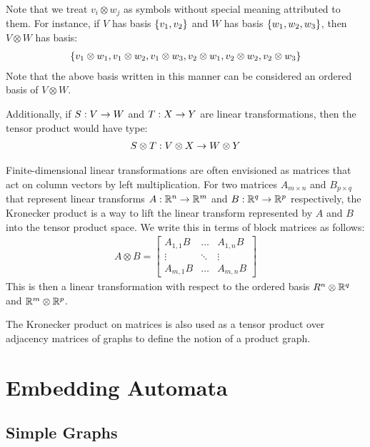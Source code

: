 \documentclass[12pt]{article}
\begin{document}
Note that we treat \(v_i \otimes w_j\)
as symbols without special meaning attributed to them.
For instance, if \(V\) has basis \(\left\{v_1, v_2\right\}\)
and \(W\) has basis \(\left\{w_1, w_2, w_3\right\}\),
then \(V \otimes W\) has basis:
\begin{align*}
  \left\{v_1 \otimes w_1, v_1 \otimes w_2, v_1 \otimes w_3,
          v_2 \otimes w_1, v_2 \otimes w_2, v_2 \otimes w_3\right\}
\end{align*}
Note that the above basis written in this manner can be considered
an ordered basis of \(V \otimes W\).

Additionally, if \(S : V \to W\) and \(T : X \to Y\)
are linear transformations,
then the tensor product would have type:
\begin{align*}
  S \otimes T : V \otimes X \to W \otimes Y
\end{align*}

Finite-dimensional linear transformations are often envisioned
as matrices that act on column vectors by left multiplication.
For two matrices \(A_{m \times n}\) and \(B_{p \times q}\)
that represent linear transforms
\(A : \mathbb{R}^n \to \mathbb{R}^m\) and \(B : \mathbb{R}^q \to \mathbb{R}^p\) respectively,
the Kronecker product is a way to lift the linear
transform represented by \(A\) and \(B\) into the tensor product space.
We write this in terms of block matrices as follows:
\begin{align*}
  {A \otimes B}
    = \begin{bmatrix}
        A_{1, 1} B & \ldots & A_{1, n} B \\
        \vdots & \ddots & \vdots \\
        A_{m, 1} B & \ldots & A_{m, n} B
      \end{bmatrix}
\end{align*}
This is then a linear transformation with respect to the ordered basis
\(R^n \otimes \mathbb{R}^q\) and \(\mathbb{R}^m \otimes \mathbb{R}^p\).

The Kronecker product on matrices is also used as a tensor product over
adjacency matrices of graphs to define the notion of a product graph.



\section{Embedding Automata}


\subsection{Simple Graphs}
\end{document}
